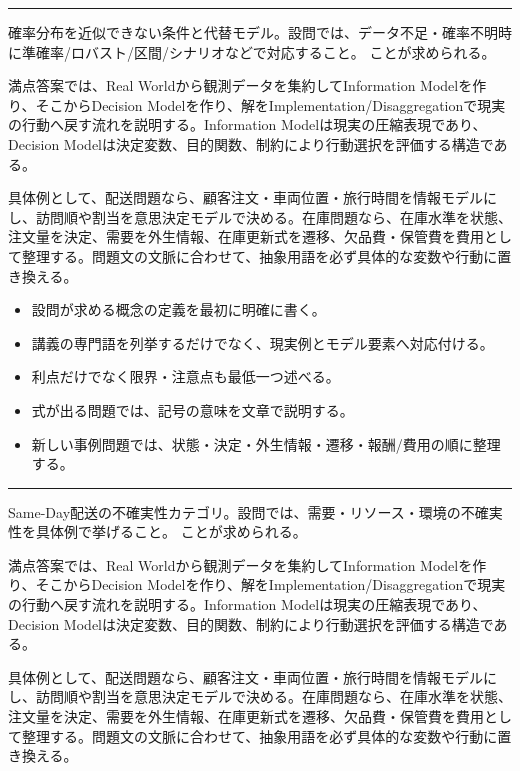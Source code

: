 \vspace{2mm}\hrule\vspace{2mm}
確率分布を近似できない条件と代替モデル。設問では、データ不足・確率不明時に準確率/ロバスト/区間/シナリオなどで対応すること。 ことが求められる。\par
{}
満点答案では、Real Worldから観測データを集約してInformation Modelを作り、そこからDecision Modelを作り、解をImplementation/Disaggregationで現実の行動へ戻す流れを説明する。Information Modelは現実の圧縮表現であり、Decision Modelは決定変数、目的関数、制約により行動選択を評価する構造である。\par
{}
具体例として、配送問題なら、顧客注文・車両位置・旅行時間を情報モデルにし、訪問順や割当を意思決定モデルで決める。在庫問題なら、在庫水準を状態、注文量を決定、需要を外生情報、在庫更新式を遷移、欠品費・保管費を費用として整理する。問題文の文脈に合わせて、抽象用語を必ず具体的な変数や行動に置き換える。\par
{}
\begin{itemize}
\item 設問が求める概念の定義を最初に明確に書く。
\item 講義の専門語を列挙するだけでなく、現実例とモデル要素へ対応付ける。
\item 利点だけでなく限界・注意点も最低一つ述べる。
\item 式が出る問題では、記号の意味を文章で説明する。
\item 新しい事例問題では、状態・決定・外生情報・遷移・報酬/費用の順に整理する。
\end{itemize}
\vspace{2mm}\hrule\vspace{2mm}
Same-Day配送の不確実性カテゴリ。設問では、需要・リソース・環境の不確実性を具体例で挙げること。 ことが求められる。\par
{}
満点答案では、Real Worldから観測データを集約してInformation Modelを作り、そこからDecision Modelを作り、解をImplementation/Disaggregationで現実の行動へ戻す流れを説明する。Information Modelは現実の圧縮表現であり、Decision Modelは決定変数、目的関数、制約により行動選択を評価する構造である。\par
{}
具体例として、配送問題なら、顧客注文・車両位置・旅行時間を情報モデルにし、訪問順や割当を意思決定モデルで決める。在庫問題なら、在庫水準を状態、注文量を決定、需要を外生情報、在庫更新式を遷移、欠品費・保管費を費用として整理する。問題文の文脈に合わせて、抽象用語を必ず具体的な変数や行動に置き換える。\par
